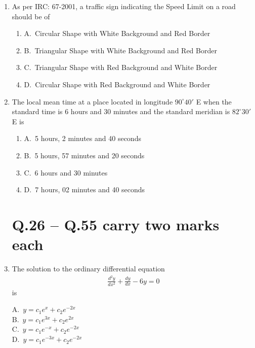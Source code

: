 \documentclass[journal,12pt,onecolumn]{exam}
\theoremstyle{remark}
\begin{document}
\begin{enumerate}
\noindent\item As per IRC: 67-2001, a traffic sign indicating the Speed Limit on a road should be of               
\hfill{}
\begin{enumerate}[label=]
    
\item A.\ Circular Shape with White Background and Red Border \\
\item B.\ Triangular Shape with White Background and Red Border \\
\item C.\ Triangular Shape with Red Background and White Border \\
\item D.\ Circular Shape with Red Background and White Border
\end{enumerate}

\noindent\item The local mean time at a place located in longitude $90^\circ40'$ E when the standard time is 6 hours and 30 minutes and the standard meridian is $82^\circ30'$ E is
\hfill{}
\begin{enumerate}[label=]
\item A.\ 5 hours, 2 minutes and 40 seconds \\
\item B.\ 5 hours, 57 minutes and 20 seconds \\
\item C.\ 6 hours and 30 minutes \\
\item D.\ 7 hours, 02 minutes and 40 seconds
\end{enumerate}

\raggedright
    
\section*{Q.26 -- Q.55 carry two marks each}

\noindent\item The solution to the ordinary differential equation
\begin{align*}
\frac{d^2y}{dx^2} + \frac{dy}{dx} - 6y = 0
\end{align*}
is
\hfill{}
\begin{multicols}{4}
A.\ $y = c_1 e^x + c_2 e^{-2x}$ \\
B.\ $y = c_1 e^{3x} + c_2 e^{2x}$ \\
C.\ $y = c_1 e^{-x} + c_2 e^{-2x}$ \\
D.\ $y = c_1 e^{-3x} + c_2 e^{-2x}$
\end{multicols}


\end{enumerate}
\end{document}
